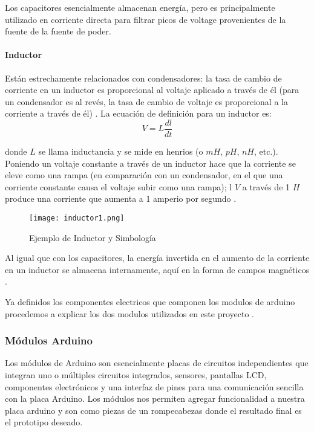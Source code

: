 \par \noindent
Los capacitores esencialmente almacenan energía, pero es principalmente utilizado en corriente directa para filtrar picos de voltage provenientes de la fuente de la fuente de poder\cite{artofelectronics}.

\paragraph{Inductor}
Están estrechamente relacionados con condensadores: la tasa de cambio de corriente en un inductor es proporcional al voltaje aplicado a través de él (para un condensador es al revés, la tasa de cambio de voltaje es proporcional a la corriente a través de él) \cite{artofelectronics}. La ecuación de definición para un inductor es:
$$V = L\frac{dl}{dt}$$

\par \noindent
donde $L$ se llama inductancia y se mide en henrios
(o $mH$, $pH$, $nH$, etc.). Poniendo un voltaje constante a través de un
inductor hace que la corriente se eleve como una rampa (en comparación con un condensador, en el que una corriente constante causa el voltaje subir como una rampa); l $V$ a través de 1 $H$ produce una corriente que aumenta a 1 amperio por segundo \cite{artofelectronics}.

\begin{figure}[H]
	\centering
	\texttt{[image: inductor1.png]}
	\caption{Ejemplo de Inductor y Simbología}
\end{figure}

\par \noindent
Al igual que con los capacitores, la energía invertida en el aumento de la corriente en un inductor se almacena internamente, aquí en la forma de campos magnéticos \cite{artofelectronics}.

\par \noindent
Ya definidos los componentes electricos que componen los modulos de arduino procedemos a explicar los dos modulos utilizados en este proyecto \cite{artofelectronics}.

\subsubsection{Módulos Arduino}

\par
Los módulos de Arduino son esencialmente placas de circuitos independientes que integran uno o múltiples circuitos integrados, sensores, pantallas LCD, componentes electrónicos y una interfaz de pines para una comunicación sencilla con la placa Arduino. Los módulos nos permiten agregar funcionalidad a nuestra placa arduino y son como piezas de un rompecabezas donde el resultado final es el prototipo deseado.

